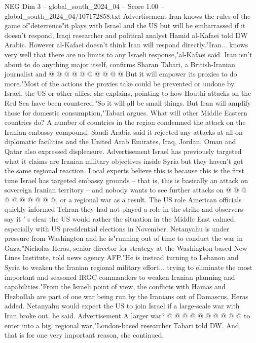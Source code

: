 \begin{textsample}{NEG Dim 3 – global\_south\_2024\_04 – Score 1.00 – global\_south\_2024\_04/107172858.txt}
Advertisement Iran knows the rules of the game of"deterrence"it plays with Israel and the US but will be embarrassed if it doesn't respond, Iraqi researcher and political analyst Hamid al-Kafaei told DW Arabic.
However al-Kafaei doesn't think Iran will respond directly."Iran... knows very well that there are no limits to any Israeli response,"al-Kafaei said.
Iran isn't about to do anything major itself, confirms Sharan Tabari, a British-Iranian journalist and @ @ @ @ @ @ @ @ @ @ But it will empower its proxies to do more."Most of the actions the proxies take could be prevented or undone by Israel, the US or other allies, she explains, pointing to how Houthi attacks on the Red Sea have been countered."So it will all be small things.
But Iran will amplify those for domestic consumption,"Tabari argues.
What will other Middle Eastern countries do?
A number of countries in the region condemned the attack on the Iranian embassy compound.
Saudi Arabia said it rejected any attacks at all on diplomatic facilities and the United Arab Emirates, Iraq, Jordan, Oman and Qatar also expressed displeasure.
Advertisement Israel has previously targeted what it claims are Iranian military objectives inside Syria but they haven't got the same regional reaction.
Local experts believe this is because this is the first time Israel has targeted embassy grounds -- that is, this is basically an attack on sovereign Iranian territory -- and nobody wants to see further attacks on @ @ @ @ @ @ @ @ @ @, or a regional war as a result.
The US role American officials quickly informed Tehran they had not played a role in the strike and observers say it ' s clear the US would rather the situation in the Middle East calmed, especially with US presidential elections in November.
Netanyahu is under pressure from Washington and he is"running out of time to conduct the war in Gaza,"Nicholas Heras, senior director for strategy at the Washington-based New Lines Institute, told news agency AFP."He is instead turning to Lebanon and Syria to weaken the Iranian regional military effort... trying to eliminate the most important and seasoned IRGC commanders to weaken Iranian planning and capabilities."From the Israeli point of view, the conflicts with Hamas and Hezbollah are part of one war being run by the Iranians out of Damascus, Heras added.
Netanyahu would expect the US to join Israel if a large-scale war with Iran broke out, he said.
Advertisement A larger war? @ @ @ @ @ @ @ @ @ @ to enter into a big, regional war,"London-based researcher Tabari told DW.
And that is for one very important reason, she continued.

\end{textsample}
